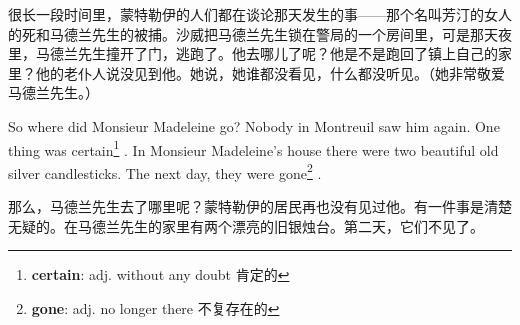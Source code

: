 \documentclass[fontset=ubuntu, zihao=5]{ctexart}
\begin{document}
\begin{paracol}{2}
\switchcolumn

很长一段时间里，蒙特勒伊的人们都在谈论那天发生的事——那个名叫芳汀的女人的死和马德兰先生的被捕。沙威把马德兰先生锁在警局的一个房间里，可是那天夜里，马德兰先生撞开了门，逃跑了。他去哪儿了呢？他是不是跑回了镇上自己的家里？他的老仆人说没见到他。她说，她谁都没看见，什么都没听见。（她非常敬爱马德兰先生。）

\switchcolumn*

So where did Monsieur Madeleine go? Nobody in Montreuil saw him again. One thing was certain\footnote{\textbf{certain}: adj. without any doubt 肯定的}
. In Monsieur Madeleine's house there were two beautiful old silver candlesticks. The next day, they were gone\footnote{\textbf{gone}:  adj. no longer there 不复存在的}
.

\switchcolumn

那么，马德兰先生去了哪里呢？蒙特勒伊的居民再也没有见过他。有一件事是清楚无疑的。在马德兰先生的家里有两个漂亮的旧银烛台。第二天，它们不见了。

\end{paracol}




\end{document}
